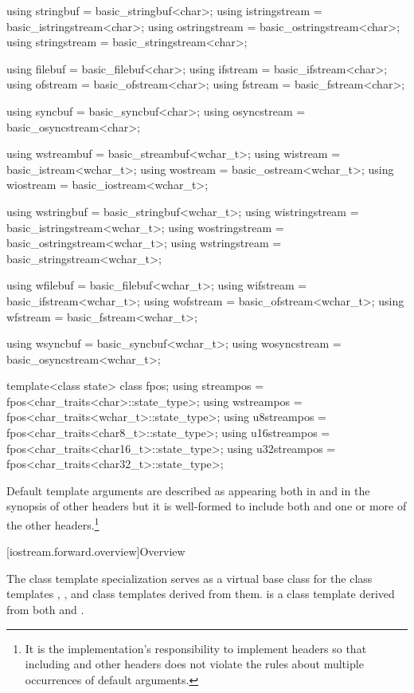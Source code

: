 \begin{codeblock}
{  using stringbuf     = basic_stringbuf<char>;
  using istringstream = basic_istringstream<char>;
  using ostringstream = basic_ostringstream<char>;
  using stringstream  = basic_stringstream<char>;

  using filebuf  = basic_filebuf<char>;
  using ifstream = basic_ifstream<char>;
  using ofstream = basic_ofstream<char>;
  using fstream  = basic_fstream<char>;

  using syncbuf = basic_syncbuf<char>;
  using osyncstream = basic_osyncstream<char>;

  using wstreambuf = basic_streambuf<wchar_t>;
  using wistream   = basic_istream<wchar_t>;
  using wostream   = basic_ostream<wchar_t>;
  using wiostream  = basic_iostream<wchar_t>;

  using wstringbuf     = basic_stringbuf<wchar_t>;
  using wistringstream = basic_istringstream<wchar_t>;
  using wostringstream = basic_ostringstream<wchar_t>;
  using wstringstream  = basic_stringstream<wchar_t>;

  using wfilebuf  = basic_filebuf<wchar_t>;
  using wifstream = basic_ifstream<wchar_t>;
  using wofstream = basic_ofstream<wchar_t>;
  using wfstream  = basic_fstream<wchar_t>;

  using wsyncbuf = basic_syncbuf<wchar_t>;
  using wosyncstream = basic_osyncstream<wchar_t>;

  template<class state> class fpos;
  using streampos  = fpos<char_traits<char>::state_type>;
  using wstreampos = fpos<char_traits<wchar_t>::state_type>;
  using u8streampos = fpos<char_traits<char8_t>::state_type>;
  using u16streampos = fpos<char_traits<char16_t>::state_type>;
  using u32streampos = fpos<char_traits<char32_t>::state_type>;
}
\end{codeblock}

\pnum
Default template arguments are described as appearing both in
and in the synopsis of other headers
but it is well-formed to include both
and one or more of the other headers.\footnote{It is the implementation's
responsibility to implement headers so
that including
and other headers does not violate the rules about
multiple occurrences of default arguments.}

[iostream.forward.overview]{Overview}

\pnum
The
class template specialization
serves as a virtual base class for the
class templates
,
,
and
class templates
derived from them.
is a class
template
derived from both
and
.

